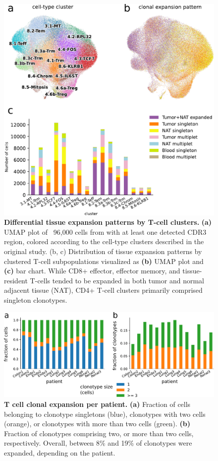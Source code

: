 \documentclass{article}
\begin{document}
\newpage
\begin{figure}[!ht]
  \centering
  \includegraphics[width=7in]{expansion_per_cluster.pdf}
  \caption{\textbf{Differential tissue expansion patterns by T-cell clusters.} \textbf{(a)} UMAP plot of ~96,000 cells from \cite{Wu2020-vp} with at least one detected CDR3 region, colored according to the cell-type clusters described in the original study. (b, c) Distribution of tissue expansion patterns by clustered T-cell subpopulations visualized as \textbf{(b)} UMAP plot and \textbf{(c)} bar chart. While CD8+ effector, effector memory, and tissue-resident T-cells tended to be expanded in both tumor and normal adjacent tissue (NAT), CD4+ T-cell clusters primarily comprised singleton clonotypes.}
\end{figure}

\newpage
\begin{figure}[!ht]
  \centering
  \includegraphics[width=7in]{clonal_expansion.pdf}
  \caption{\textbf{T cell clonal expansion per patient.} \textbf{(a)} Fraction of cells belonging to clonotype singletons (blue), clonotypes with two cells (orange), or clonotypes with more than two cells (green). \textbf{(b)} Fraction of clonotypes comprising two, or more than two cells, respectively. Overall, between 8\% and 19\% of clonotypes were expanded, depending on the patient.}
\end{figure}
\end{document}
